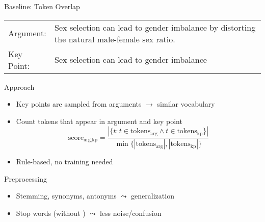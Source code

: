 \documentclass[english,handout]{mlutalk}
\begin{document}
\begin{frame}[allowframebreaks]{Baseline: Token Overlap}
  \begin{example}
    \smaller\renewcommand{\arraystretch}{1.15}
    \begin{tabularx}{0.65\linewidth}{@{}lX@{}}
      Argument: & \textcolor{Magenta4}{Sex} \textcolor{OliveDrab4}{selection} can lead to \textcolor{Orange2}{gender} \textcolor{DodgerBlue3}{imbalance} by distorting the natural male-female \textcolor{Magenta4}{sex} ratio. \\
      Key Point: & \textcolor{Magenta4}{Sex} \textcolor{OliveDrab4}{selection} can lead to \textcolor{Orange2}{gender} \textcolor{DodgerBlue3}{imbalance}
    \end{tabularx}
  \end{example}
  
  \begin{block}{Approach}
    \begin{itemize}
      \item Key points are sampled from arguments \(\to\) similar vocabulary
      \item Count tokens that appear in argument and key point
      {\smaller\begin{equation*}
        \text{score}_{\text{arg},\text{kp}} = \frac{ | \{ t : t \in \text{tokens}_\text{arg} \land t \in \text{tokens}_\text{kp} \} | }{ \min\{ |\text{tokens}_\text{arg}|, |\text{tokens}_\text{kp}| \} }
      \end{equation*}}
      \item Rule-based, \textcolor{Green4}{no training needed}
    \end{itemize}
  \end{block}

  \begin{block}{Preprocessing}
    \begin{itemize}
      \item Stemming, synonyms, antonyms \(\leadsto\) generalization
      \item Stop words (without ) \(\leadsto\) less noise/confusion
    \end{itemize}
  \end{block}

\end{frame}
\end{document}
